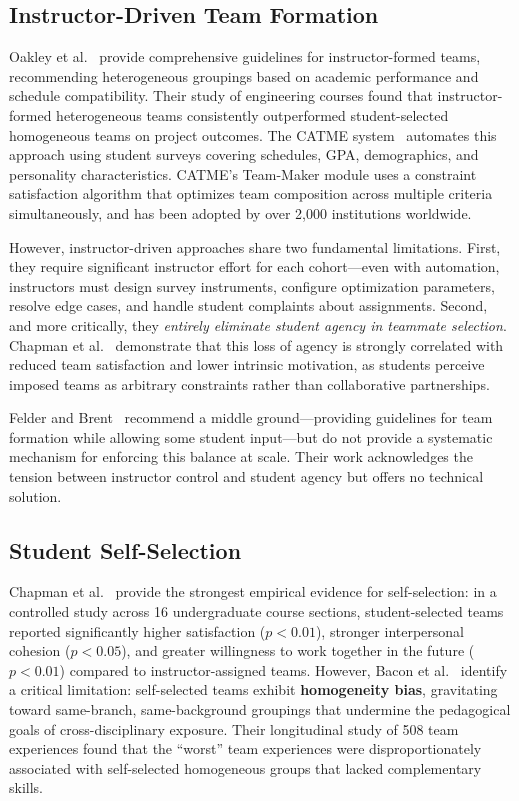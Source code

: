 \documentclass[conference]{IEEEtran}
\begin{document}
\subsection{Instructor-Driven Team Formation}

Oakley et al.~\cite{oakley2004} provide comprehensive guidelines for instructor-formed teams, recommending heterogeneous groupings based on academic performance and schedule compatibility. Their study of engineering courses found that instructor-formed heterogeneous teams consistently outperformed student-selected homogeneous teams on project outcomes. The CATME system~\cite{ohland2012} automates this approach using student surveys covering schedules, GPA, demographics, and personality characteristics. CATME's Team-Maker module uses a constraint satisfaction algorithm that optimizes team composition across multiple criteria simultaneously, and has been adopted by over 2,000 institutions worldwide.

However, instructor-driven approaches share two fundamental limitations. First, they require significant instructor effort for each cohort---even with automation, instructors must design survey instruments, configure optimization parameters, resolve edge cases, and handle student complaints about assignments. Second, and more critically, they \textit{entirely eliminate student agency in teammate selection}. Chapman et al.~\cite{chapman2006} demonstrate that this loss of agency is strongly correlated with reduced team satisfaction and lower intrinsic motivation, as students perceive imposed teams as arbitrary constraints rather than collaborative partnerships.

Felder and Brent~\cite{felder2000} recommend a middle ground---providing guidelines for team formation while allowing some student input---but do not provide a systematic mechanism for enforcing this balance at scale. Their work acknowledges the tension between instructor control and student agency but offers no technical solution.

\subsection{Student Self-Selection}

Chapman et al.~\cite{chapman2006} provide the strongest empirical evidence for self-selection: in a controlled study across 16 undergraduate course sections, student-selected teams reported significantly higher satisfaction ($p < 0.01$), stronger interpersonal cohesion ($p < 0.05$), and greater willingness to work together in the future ($p < 0.01$) compared to instructor-assigned teams. However, Bacon et al.~\cite{bacon2004} identify a critical limitation: self-selected teams exhibit \textbf{homogeneity bias}, gravitating toward same-branch, same-background groupings that undermine the pedagogical goals of cross-disciplinary exposure. Their longitudinal study of 508 team experiences found that the ``worst'' team experiences were disproportionately associated with self-selected homogeneous groups that lacked complementary skills.
\end{document}
